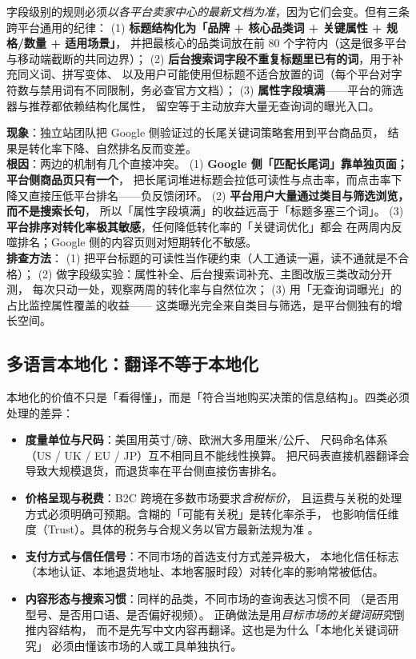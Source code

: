 字段级别的规则必须\emph{以各平台卖家中心的最新文档为准}，因为它们会变。但有三条跨平台通用的纪律：
(1) \textbf{标题结构化为「品牌 + 核心品类词 + 关键属性 + 规格/数量 + 适用场景」}，
并把最核心的品类词放在前 80 个字符内（这是很多平台与移动端截断的共同边界）；
(2) \textbf{后台搜索词字段不重复标题里已有的词}，用于补充同义词、拼写变体、
        以及用户可能使用但标题不适合放置的词（每个平台对字符数与禁用词有不同限制，务必查官方文档）；
(3) \textbf{属性字段填满}——平台的筛选器与推荐都依赖结构化属性，
        留空等于主动放弃大量无查询词的曝光入口。

\begin{pitfall}
\textbf{现象}：独立站团队把 Google 侧验证过的长尾关键词策略套用到平台商品页，
结果是转化率下降、自然排名反而变差。\\
\textbf{根因}：两边的机制有几个直接冲突。
(1) \textbf{Google 侧「匹配长尾词」靠单独页面；平台侧商品页只有一个}，
        把长尾词堆进标题会拉低可读性与点击率，而点击率下降又直接压低平台排名——负反馈闭环。
(2) \textbf{平台用户大量通过类目与筛选浏览，而不是搜索长句}，
        所以「属性字段填满」的收益远高于「标题多塞三个词」。
(3) \textbf{平台排序对转化率极其敏感}，任何降低转化率的「关键词优化」都会
        在两周内反噬排名；Google 侧的内容页则对短期转化不敏感。
\\
\textbf{排查方法}：
(1) 把平台标题的可读性当作硬约束（人工通读一遍，读不通就是不合格）；
(2) 做字段级实验：属性补全、后台搜索词补充、主图改版三类改动分开测，
        每次只动一处，观察两周的转化率与自然位次；
(3) 用「无查询词曝光」的占比监控属性覆盖的收益——
        这类曝光完全来自类目与筛选，是平台侧独有的增长空间。
\end{pitfall}

\subsection{多语言本地化：翻译不等于本地化}

本地化的价值不只是「看得懂」，而是「符合当地购买决策的信息结构」。四类必须处理的差异：

\begin{itemize}
  \item \textbf{度量单位与尺码}：美国用英寸/磅、欧洲大多用厘米/公斤、
        尺码命名体系（US / UK / EU / JP）互不相同且不能线性换算。
        把尺码表直接机器翻译会导致大规模退货，而退货率在平台侧直接伤害排名。
  \item \textbf{价格呈现与税费}：B2C 跨境在多数市场要求\emph{含税标价}，
        且运费与关税的处理方式必须明确可预期。含糊的「可能有关税」是转化率杀手，
        也影响信任维度（Trust）。具体的税务与合规义务以官方最新法规为准 \cite{eu_oss}。
  \item \textbf{支付方式与信任信号}：不同市场的首选支付方式差异极大，
        本地化信任标志（本地认证、本地退货地址、本地客服时段）对转化率的影响常被低估。
  \item \textbf{内容形态与搜索习惯}：同样的品类，不同市场的查询表达习惯不同
        （是否用型号、是否用口语、是否偏好视频）。
        正确做法是用\emph{目标市场的关键词研究}倒推内容结构，
        而不是先写中文内容再翻译。这也是为什么「本地化关键词研究」
        必须由懂该市场的人或工具单独执行。
\end{itemize}


